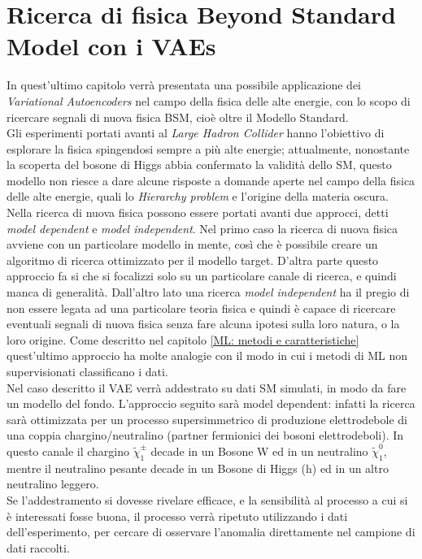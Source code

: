 \section{Ricerca di fisica Beyond Standard Model con i VAEs}
\label{fisica_BSM_VAEs}

In quest'ultimo capitolo verrà presentata una possibile applicazione dei \textit{Variational Autoencoders} nel campo della fisica delle alte energie, con lo scopo di ricercare segnali di nuova fisica BSM, cioè oltre il Modello Standard. \\
Gli esperimenti portati avanti al \textit{Large Hadron Collider} hanno l'obiettivo di esplorare la fisica spingendosi sempre a più alte energie; attualmente, nonostante la scoperta del bosone di Higgs abbia confermato la validità dello SM, questo modello non riesce a dare alcune risposte a domande aperte nel campo della fisica delle alte energie, quali lo \textit{Hierarchy problem} e l'origine della materia oscura. \\
Nella ricerca di nuova fisica possono essere portati avanti due approcci, detti \textit{model dependent} e \textit{model independent}. Nel primo caso la ricerca di nuova fisica avviene con un particolare modello in mente, così che è possibile creare un algoritmo di ricerca ottimizzato per il modello target. D'altra parte questo approccio fa si che si focalizzi solo su un particolare canale di ricerca, e quindi manca di generalità. Dall'altro lato una ricerca \textit{model independent} ha il pregio di non essere legata ad una particolare teoria fisica e quindi è capace di ricercare eventuali segnali di nuova fisica senza fare alcuna ipotesi sulla loro natura, o la loro origine. Come descritto nel capitolo \ref{ML: metodi e caratteristiche} quest'ultimo approccio ha molte analogie con il modo in cui i metodi di ML non supervisionati classificano i dati.\\
Nel caso descritto il VAE verrà addestrato su dati SM simulati, in modo da fare un modello del fondo. L'approccio seguito sarà model dependent: infatti la ricerca sarà ottimizzata per un processo supersimmetrico di produzione elettrodebole di una coppia chargino/neutralino (partner fermionici dei bosoni elettrodeboli). In questo canale il chargino $\tilde{\chi}_1^\pm$ decade in un Bosone W ed in un neutralino $\tilde{\chi}_1^0$, mentre il neutralino pesante decade in un Bosone di Higgs (h) ed in un altro neutralino leggero.\\
Se l'addestramento si dovesse rivelare efficace, e la sensibilità al processo a cui si è interessati fosse buona, il processo verrà ripetuto utilizzando i dati dell'esperimento, per cercare di osservare l'anomalia direttamente nel campione di dati raccolti. \\

